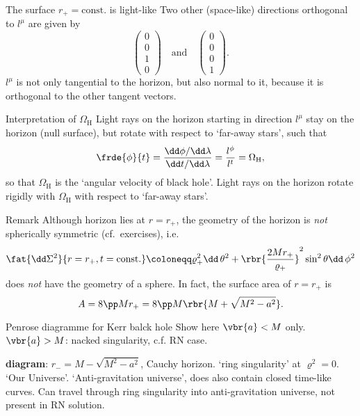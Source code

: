 \begin{nameddef}{The surface $r_+ = \text{const.}$ is light-like}
Two other (space-like) directions orthogonal to $l^\mu$ are given by
\begin{equation}
\begin{pmatrix} 0 \\ 0 \\ 1 \\ 0 \end{pmatrix} \quad \text{and} \quad
\begin{pmatrix} 0 \\ 0 \\ 0 \\ 1 \end{pmatrix}.
\end{equation}
$l^\mu$ is not only tangential to the horizon, but also normal to it,
because it is orthogonal to the other tangent vectors.
\end{nameddef} %

\begin{namedrem}{Interpretation of $\Omega_\text{H}$}
Light rays on the horizon starting in direction $l^\mu$ stay on the horizon
(null surface), but rotate with respect to `far-away stars', such that
\begin{equation}
\frde{\phi}{t} = \frac{\dd\phi/\dd\lambda}{\dd t/\dd\lambda}
= \frac{l^\phi}{l^t} = \Omega_\text{H},
\end{equation}
so that $\Omega_\text{H}$ is the `angular velocity of black hole'. Light rays
on the horizon rotate rigidly with $\Omega_\text{H}$ with respect to 
`far-away stars'.
\end{namedrem} %

\begin{namedrem}{Remark}
Although horizon lies at $r = r_+$, the geometry of the horizon is \emph{not}
spherically symmetric (cf.\ exercises), i.e.\
\begin{equation}
\fat{\dd \Sigma^2}{r = r_+, t = \text{const.}} \coloneqq
\varrho_+^2 \dd\,\theta^2 + \rbr{\frac{2Mr_+}{\varrho_+}}^2\sin^2\theta
\dd\,\phi^2
\end{equation}
does \emph{not} have the geometry of a sphere. In fact, the surface area of
$r = r_+$ is
\begin{equation}
A = 8\pp M r_+ = 8 \pp M \rbr{M+\sqrt{M^2-a^2}}.
\end{equation}
\end{namedrem} %

\begin{nameddef}{Penrose diagramme for Kerr balck hole}
\label{nthm:pd-Kerr}
Show here $\vbr{a} < M$ only. $\vbr{a} > M$: nacked singularity, c.f. RN case.

\textbf{diagram}: $r_- = M - \sqrt{M^2 - a^2}$, Cauchy horizon.
`ring singularity' at $\varrho^2 = 0$. `Our Universe'. `Anti-gravitation
universe', does also contain closed time-like curves. Can travel through ring
singularity into anti-gravitation universe, not present in RN solution.
\end{nameddef} %

